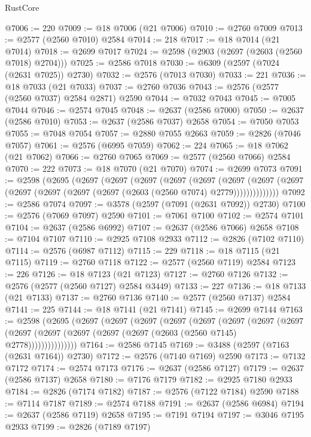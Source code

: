 \begin{lexlean}{RustCore}
\begin{coremodule}
@7006 := 220
@7009 := @18 @7006 (@21 @7006)
@7010 := @2760 @7009
@7013 := @2577 (@2560 @7010) @2584
@7014 := 218
@7017 := @18 @7014 (@21 @7014)
@7018 := @2699 @7017
@7024 := @2598 (@2903 (@2697 (@2603 (@2560 @7018) @2704)))
@7025 := @2586 @7018
@7030 := @6309 (@2597 (@7024 (@2631 @7025)) @2730)
@7032 := @2576 (@7013 @7030)
@7033 := 221
@7036 := @18 @7033 (@21 @7033)
@7037 := @2760 @7036
@7043 := @2576 (@2577 (@2560 @7037) @2584 @2871) @2590
@7044 := @7032 @7043
@7045 := @7005 @7044
@7046 := @2574 @7045
@7048 := @2637 (@2586 @7000)
@7050 := @2637 (@2586 @7010)
@7053 := @2637 (@2586 @7037) @2658
@7054 := @7050 @7053
@7055 := @7048 @7054
@7057 := @2880 @7055 @2663
@7059 := @2826 (@7046 @7057)
@7061 := @2576 (@6995 @7059)
@7062 := 224
@7065 := @18 @7062 (@21 @7062)
@7066 := @2760 @7065
@7069 := @2577 (@2560 @7066) @2584
@7070 := 222
@7073 := @18 @7070 (@21 @7070)
@7074 := @2699 @7073
@7091 := @2598
    (@2695
      (@2697
        (@2697
          (@2697
            (@2697
              (@2697
                (@2697
                  (@2697 (@2697 (@2697 (@2697 (@2697 (@2697 (@2603 (@2560 @7074) @2779))))))))))))))
@7092 := @2586 @7074
@7097 := @3578 (@2597 (@7091 (@2631 @7092)) @2730)
@7100 := @2576 (@7069 @7097) @2590
@7101 := @7061 @7100
@7102 := @2574 @7101
@7104 := @2637 (@2586 @6992)
@7107 := @2637 (@2586 @7066) @2658
@7108 := @7104 @7107
@7110 := @2925 @7108 @2933
@7112 := @2826 (@7102 @7110)
@7114 := @2576 (@6987 @7112)
@7115 := 229
@7118 := @18 @7115 (@21 @7115)
@7119 := @2760 @7118
@7122 := @2577 (@2560 @7119) @2584
@7123 := 226
@7126 := @18 @7123 (@21 @7123)
@7127 := @2760 @7126
@7132 := @2576 (@2577 (@2560 @7127) @2584 @3449)
@7133 := 227
@7136 := @18 @7133 (@21 @7133)
@7137 := @2760 @7136
@7140 := @2577 (@2560 @7137) @2584
@7141 := 225
@7144 := @18 @7141 (@21 @7141)
@7145 := @2699 @7144
@7163 := @2598
    (@2695
      (@2697
        (@2697
          (@2697
            (@2697
              (@2697
                (@2697
                  (@2697
                    (@2697
                      (@2697 (@2697 (@2697 (@2697 (@2697 (@2603 (@2560 @7145) @2778)))))))))))))))
@7164 := @2586 @7145
@7169 := @3488 (@2597 (@7163 (@2631 @7164)) @2730)
@7172 := @2576 (@7140 @7169) @2590
@7173 := @7132 @7172
@7174 := @2574 @7173
@7176 := @2637 (@2586 @7127)
@7179 := @2637 (@2586 @7137) @2658
@7180 := @7176 @7179
@7182 := @2925 @7180 @2933
@7184 := @2826 (@7174 @7182)
@7187 := @2576 (@7122 @7184) @2590
@7188 := @7114 @7187
@7189 := @2574 @7188
@7191 := @2637 (@2586 @6984)
@7194 := @2637 (@2586 @7119) @2658
@7195 := @7191 @7194
@7197 := @3046 @7195 @2933
@7199 := @2826 (@7189 @7197)

\end{coremodule}
\end{lexlean}
